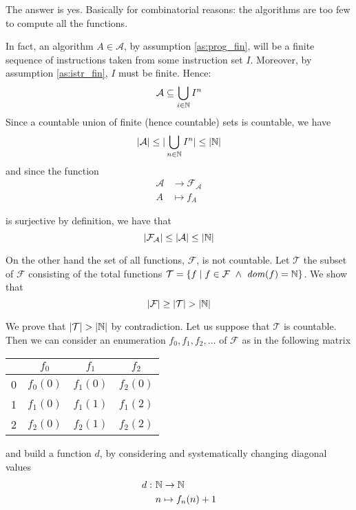 The answer is yes. Basically for combinatorial reasons: the algorithms are too few to compute all the
functions.

In fact, an algorithm $A \in \mathcal{A}$, by
assumption \ref{as:prog_fin}, will be a finite sequence of instructions taken from
some instruction set $I$. Moreover, by assumption \ref{as:istr_fin},
$I$ must be finite. Hence:
\begin{equation*}
  \mathcal{A} \subseteq \bigcup_{i \in \mathbb{N}} I^n
\end{equation*}
Since a countable union of finite (hence countable) sets is countable, we have
\begin{equation*}
  |\mathcal{A}| \leq |\bigcup_{n\in\mathbb{N}} I^n| \leq |\mathbb{N}|
\end{equation*}
and since the function
\begin{align*}
  \mathcal{A} & \to \mathcal{F}_\mathcal{A}\\
  A & \mapsto f_A
\end{align*}

is surjective by definition, we have that
\begin{equation*}
    |\mathcal{F}_\mathcal{A}| \leq |\mathcal{A}| \leq |\mathbb{N}|
\end{equation*}

On the other hand the set of all functions, $\mathcal{F}$, is not countable. Let $\mathcal{T}$ the subset of $\mathcal{F}$ consisting of the total functions $\mathcal{T} = \{ f \mid f \in \mathcal{F}\ \land\ \mathit{dom}({f}) = \mathbb{N}\}$. We show that
\begin{equation*}
  |\mathcal{F}| \geq |\mathcal{T}| > |\mathbb{N}|
\end{equation*}

We prove that $|\mathcal{T}| > |\mathbb{N}|$ by contradiction. Let us suppose that $\mathcal{T}$ is countable. 
Then we can consider an enumeration $f_0, f_1, f_2, \ldots$ of $\mathcal{F}$ as in the following matrix
\begin{center}
  \begin{tabular}{c|ccc}
    & $f_0$    & $f_1$    & $f_2$\\
    \hline
    0 & $f_0(0)$ & $f_1(0)$ & $f_2(0)$ \\
    1 & $f_1(0)$ & $f_1(1)$ & $f_1(2)$ \\
    2 & $f_2(0)$ & $f_2(1)$ & $f_2(2)$
  \end{tabular}
\end{center}
and build a function $d$, by considering and systematically changing diagonal values 
\begin{align*}
  d :\ & \mathbb{N} \to \mathbb{N}\\
  & n \mapsto f_n(n)+1
\end{align*}


